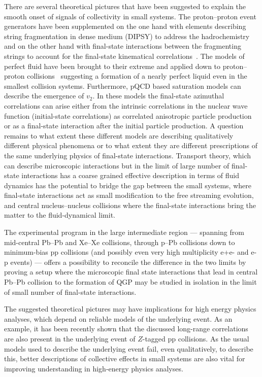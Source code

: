 \documentclass[../report.tex]{subfiles}
\begin{document}
There are several theoretical pictures that have been suggested to explain the smooth onset of signals of collectivity in small systems. The proton--proton event generators have been supplemented on the one hand with elements describing string fragmentation in dense medium (DIPSY) to address the hadrochemistry and on the other hand with final-state interactions between the fragmenting strings to account for the final-state kinematical correlations~\cite{Bierlich:2017vhg}. 
The models of perfect fluid have been brought to their extreme and applied down to proton--proton collisions~\cite{Weller:2017tsr,Aidala:2018mcw} suggesting a formation of a nearly perfect liquid even in the smallest collision systems. Furthermore, pQCD based saturation models can describe the emergence of $v_2$. In these models the final-state azimuthal correlations can arise either from the intrinsic correlations in the nuclear wave function (initial-state correlations) as correlated anisotropic particle production or as a final-state interaction after the initial particle production. 
A question remains to what extent these different models are describing qualitatively different physical phenomena or to what extent they are different prescriptions of the same underlying physics of final-state interactions. Transport theory, which can describe microscopic interactions but in the limit of large number of final-state interactions has a coarse grained effective description in terms of fluid dynamics has the potential to bridge the gap between the small systems, where final-state interactions act as small modification to the free streaming evolution, and central nucleus--nucleus collisions where the final-state interactions bring the matter to the fluid-dynamical limit. 

The experimental program in the large intermediate region --- spanning from mid-central Pb--Pb and Xe--Xe collisions, through p--Pb collisions down to minimum-bias pp collisions (and possibly even very high multiplicity e+e- and e-p events) --- offers a possibility to reconcile the difference in the two limits by proving a setup where the microscopic final state interactions that lead in central Pb--Pb collision to the formation of QGP may be studied in isolation in the limit of small number of final-state interactions.  

The suggested theoretical pictures may have implications for high energy physics analyses, which depend on reliable models of the underlying event. As an example, it has been recently shown that the discussed long-range correlations are also present in the underlying event of $Z$-tagged pp collisions. As the usual models used to describe the underlying event fail, even qualitatively, to describe this, better descriptions of collective effects in small systems are also vital for improving understanding in high-energy physics analyses.
\end{document}
